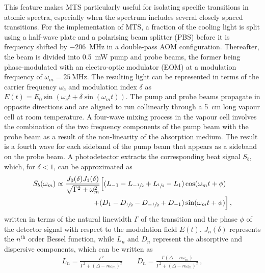 \documentclass[../Thesis-IJspeert.tex]{subfiles}
\begin{document}
This feature makes MTS particularly useful for isolating specific transitions in atomic spectra, especially when the spectrum includes several closely spaced transitions. For the implementation of MTS, a fraction of the cooling light is split using a half-wave plate and a polarising beam splitter (PBS) before it is frequency shifted by \SI{-206}{\mega\hertz} in a double-pass AOM configuration. Thereafter, the beam is divided into \SI{0.5}{\milli\watt} pump and probe beams, the former being phase-modulated with an electro-optic modulator (EOM) at a modulation frequency of $\omega_m=\SI{25}{\mega\hertz}$. The resulting light can be represented in terms of the carrier frequency $\omega_c$ and modulation index $\delta$ as $E(t)=E_0\sin(\omega_c t+\delta\sin(\omega_m t))$. The pump and probe beams propagate in opposite directions and are aligned to run collinearly through a \SI{5}{\centi\meter} long  vapour cell at room temperature. A four-wave mixing process in the vapour cell involves the combination of the two frequency components of the pump beam with the probe beam as a result of the non-linearity of the absorption medium. The result is a fourth wave for each sideband of the pump beam that appears as a sideband on the probe beam. A photodetector extracts the corresponding beat signal $S_b$, which, for $\delta < 1$, can be approximated as \cite{Shirley1982}
\begin{align}
\label{mtsbeatsignal}
\begin{split}
	S_b(\omega_m) \propto \frac{J_0(\delta)J_1(\delta)}{\sqrt{\Gamma^2+\omega_m^2}}  \Big[ (L_{-1} - L_{-\sfrac{1}{2}} + L_{\sfrac{1}{2}} - L_1) &\cos(\omega_m t + \phi) \\
	+ (D_{1} - D_{\sfrac{1}{2}} - D_{-\sfrac{1}{2}} + D_{-1}) &\sin(\omega_m t + \phi) \Big]\,,
\end{split}
\end{align}
written in terms of the natural linewidth $\Gamma$ of the transition and the phase $\phi$ of the detector signal with respect to the modulation field $E(t)$. $J_n(\delta)$ represents the $n^{\text{th}}$ order Bessel function, while $L_n$ and $D_n$ represent the absorptive and dispersive components, which can be written as
\begin{align}
L_n = \frac{\Gamma^2}{\Gamma^2 + (\Delta - n \omega_m)^2}\quad\quad D_n = \frac{\Gamma (\Delta - n \omega_m)}{\Gamma^2 + (\Delta - n \omega_m)^2}\,,
\end{align}
\end{document}
